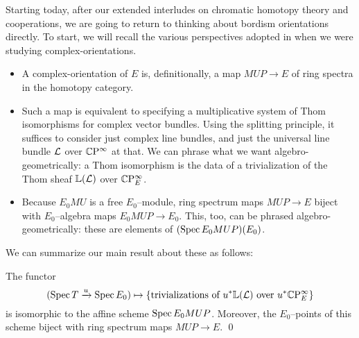 Starting today, after our extended interludes on chromatic homotopy theory and cooperations, we are going to return to thinking about bordism orientations directly.  To start, we will recall the various perspectives adopted in  when we were studying complex-orientations.
\begin{itemize}
\item A complex-orientation of $E$ is, definitionally, a map $MUP \to E$ of ring spectra in the homotopy category.
\item Such a map is equivalent to specifying a multiplicative system of Thom isomorphisms for complex vector bundles.  Using the splitting principle, it suffices to consider just complex line bundles, and just the universal line bundle $\mathcal{L}$ over $\mathbb{C}\mathrm P^\infty$ at that.  We can phrase what we want algebro-geometrically: a Thom isomorphism is the data of a trivialization of the Thom sheaf $\mathbb{L}(\mathcal{L})$ over $\mathbb{C}\mathrm P^\infty_E$.
\item Because $E_0 MU$ is a free $E_0$--module, ring spectrum maps $MUP \to E$ biject with $E_0$--algebra maps $E_0 MUP \to E_0$.  This, too, can be phrased algebro-geometrically: these are elements of $(\operatorname{Spec} E_0 MUP)(E_0)$.
\end{itemize}
We can summarize our main result about these as follows:
\begin{theorem}\label{BUZTriumvirate}
The functor \[(\operatorname{Spec} T \xrightarrow{u} \operatorname{Spec} E_0) \mapsto \left\{ \text{trivializations of $u^* \mathbb{L}(\mathcal{L})$ over $u^* \mathbb{C}\mathrm P^\infty_E$} \right\}\] is isomorphic to the affine scheme $\operatorname{Spec} E_0 MUP$.  Moreover, the $E_0$--points of this scheme biject with ring spectrum maps $MUP \to E$. \qed
\end{theorem}

